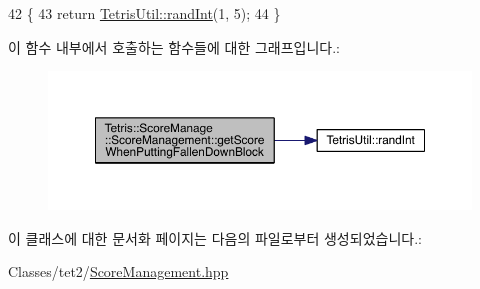 \begin{DoxyCode}
42                                                            \{
43                 \textcolor{keywordflow}{return} \hyperlink{class_tetris_util_a0a60e809425ddb416a500bcc03cf7061}{TetrisUtil::randInt}(1, 5);
44             \}
\end{DoxyCode}
이 함수 내부에서 호출하는 함수들에 대한 그래프입니다.\+:
\nopagebreak
\begin{figure}[H]
\begin{center}
\leavevmode
\includegraphics[width=350pt]{d9/d94/class_tetris_1_1_score_manage_1_1_score_management_a275253fb7c1bb1820ddba3b666b9db09_cgraph}
\end{center}
\end{figure}


이 클래스에 대한 문서화 페이지는 다음의 파일로부터 생성되었습니다.\+:\begin{DoxyCompactItemize}
\item 
Classes/tet2/\hyperlink{_score_management_8hpp}{Score\+Management.\+hpp}\end{DoxyCompactItemize}
